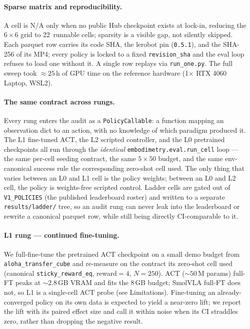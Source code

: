\documentclass[10pt]{article}
\begin{document}
\paragraph{Sparse matrix and reproducibility.}
A cell is N/A only when no public Hub checkpoint exists at lock-in,
reducing the $6\times6$ grid to 22~runnable cells; sparsity is a visible
gap, not silently skipped. Each parquet row carries its code SHA, the
lerobot pin (\texttt{0.5.1}), and the SHA-256 of its MP4; every policy is
locked to a fixed \texttt{revision\_sha} and the eval loop refuses to load
one without it. A single row replays via \texttt{run\_one.py}. The full
sweep took $\approx 25$\,h of GPU time on the reference hardware
(1$\times$ RTX 4060 Laptop, WSL2).

\paragraph{The same contract across rungs.}
\label{sec:ladder-contract}
Every rung enters the audit as a \texttt{PolicyCallable}: a function
mapping an observation dict to an action, with no knowledge of which
paradigm produced it. The L1 fine-tuned ACT, the L2 scripted controller,
and the L0 pretrained checkpoints all run through the \emph{identical}
\texttt{embodimetry.eval.run\_cell} loop --- the same per-cell seeding
contract, the same $5{\times}50$ budget, and the same env-canonical
success rule the corresponding zero-shot cell used. The only thing that
varies between an L0 and L1 cell is the policy weights; between an L0 and
L2 cell, the policy is weights-free scripted control. Ladder cells are
gated out of \texttt{V1\_POLICIES} (the published leaderboard roster) and
written to a separate \texttt{results/ladder/} tree, so an audit rung can
never leak into the leaderboard or rewrite a canonical parquet row, while
still being directly CI-comparable to it.

\paragraph{L1 rung --- continued fine-tuning.}
We full-fine-tune the pretrained ACT checkpoint on a small demo budget
from \texttt{aloha\_transfer\_cube} and re-measure on the contract its
zero-shot cell used (canonical \texttt{sticky\_reward\_eq}, reward${=}4$,
$N{=}250$). ACT (${\sim}50$\,M params) full-FT peaks at ${\sim}2.8$\,GB
VRAM and fits the 8\,GB budget; SmolVLA full-FT does not, so L1 is a
single-cell ACT probe (see Limitations). Fine-tuning an already-converged
policy on its own data is expected to yield a near-zero lift; we report
the lift with its paired effect size and call it within noise when its CI
straddles zero, rather than dropping the negative result.
\end{document}
